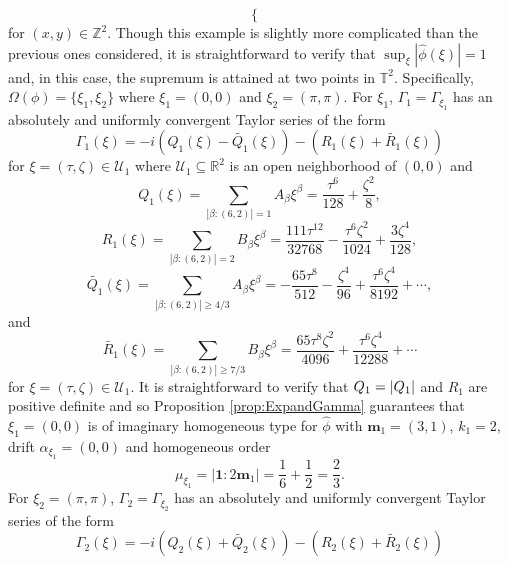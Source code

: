 \documentclass[11pt, letter]{book}
\newenvironment{example}
  {\pushQED{\qed}\renewcommand{\qedsymbol}{$\triangle$}\examplex}
  {\popQED\endexamplex}
\newcommand{\f}[2]{\frac{#1}{#2}}
\begin{document}
\begin{example}
\begin{equation*}
\begin{cases}
    \end{cases}
\end{equation*}
for $(x,y)\in\mathbb{Z}^2$. Though this example is slightly more complicated than the previous ones considered, it is straightforward to verify that $\sup_{\xi}|\widehat{\phi}(\xi)|=1$ and, in this case, the supremum is attained at two points in $\mathbb{T}^2$. Specifically, $\Omega(\phi)=\{\xi_1,\xi_2\}$ where $\xi_1=(0,0)$ and $\xi_2=(\pi,\pi)$. For $\xi_1$, $\Gamma_1=\Gamma_{\xi_1}$ has an absolutely and uniformly convergent Taylor series of the form
\begin{equation*}
    \Gamma_{1}(\xi)=-i\left(Q_{1}(\xi)-\widetilde{Q_1}(\xi)\right)-\left(R_1(\xi)+\widetilde{R_1}(\xi)\right)
\end{equation*}
for $\xi=(\tau,\zeta)\in\mathcal{U}_1$ where $\mathcal{U}_1\subseteq\mathbb{R}^2$ is an open neighborhood of $(0,0)$ and
\begin{equation*}
    Q_{1}(\xi)=\sum_{|\beta:(6,2)|=1}A_\beta \xi^\beta=\frac{\tau^6}{128}+\frac{\zeta^2}{8},
\end{equation*}
\begin{equation*}
    R_1(\xi)=\sum_{|\beta:(6,2)|=2}B_\beta\xi^\beta=\frac{111\tau^{12}}{32768}-\frac{\tau^6 \zeta^2}{1024}+\frac{3\zeta^4}{128},
\end{equation*}
\begin{equation*}
    \widetilde{Q_1}(\xi)=\sum_{|\beta:(6,2)|\geq 4/3}A_\beta \xi^\beta=-\f{65\tau^8}{512} -\f{\zeta^4}{96} + \frac{\tau^6\zeta^4}{8192} 
    +\cdots,
\end{equation*}
and
\begin{equation*}
    \widetilde{R_1}(\xi)=\sum_{|\beta:(6,2)|\geq 7/3}B_\beta\xi^\beta=\f{65\tau^8\zeta^2}{4096}  + \f{\tau^6 \zeta^4}{12288} + \cdots
\end{equation*}
for $\xi=(\tau,\zeta)\in\mathcal{U}_1$. It is straightforward to verify that $Q_1=\abs{Q_1}$ and $R_1$ are positive definite and so Proposition \ref{prop:ExpandGamma} guarantees that $\xi_1=(0,0)$ is of imaginary homogeneous type for $\widehat{\phi}$ with $\mathbf{m}_1=(3,1)$, $k_1=2$, drift $\alpha_{\xi_1}=(0,0)$ and homogeneous order
\begin{equation*}
    \mu_{\xi_1}=|\mathbf{1}:2\mathbf{m}_1|=\frac{1}{6}+\frac{1}{2}=\frac{2}{3}.
\end{equation*}
For $\xi_2 = (\pi,\pi)$, $\Gamma_2=\Gamma_{\xi_2}$ has an absolutely and uniformly convergent Taylor series of the form
\begin{equation*}
    \Gamma_2(\xi)=-i\left(Q_2(\xi)+\widetilde{Q_2}(\xi)\right)-\left(R_2(\xi)+\widetilde{R_2}(\xi)\right)

\end{equation*}
\end{example}
\end{document}
